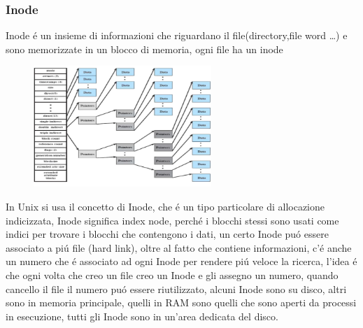 \subsubsection*{Inode}
Inode é un insieme di informazioni che riguardano il file(directory,file word \ldots) e sono memorizzate in un blocco di memoria, ogni file ha un inode
\begin{figure}[H]
    \centering
    \includegraphics[width=0.6\textwidth]{immagini/Inode}
\end{figure}
In Unix si usa il concetto di Inode, che é un tipo particolare di allocazione indicizzata, Inode significa index node, perché i blocchi
stessi sono usati come indici per trovare i blocchi che contengono i dati, un certo Inode puó essere associato a piú file (hard link), oltre al fatto che
contiene informazioni, c'é anche un numero che é associato ad ogni Inode per rendere piú veloce la ricerca, l'idea é che ogni volta che creo un file
creo un Inode e gli assegno un numero, quando cancello il file il numero puó essere riutilizzato, alcuni Inode sono su disco, altri sono in memoria principale,
quelli in RAM sono quelli che sono aperti da processi in esecuzione, tutti gli Inode sono in un'area dedicata del disco.

